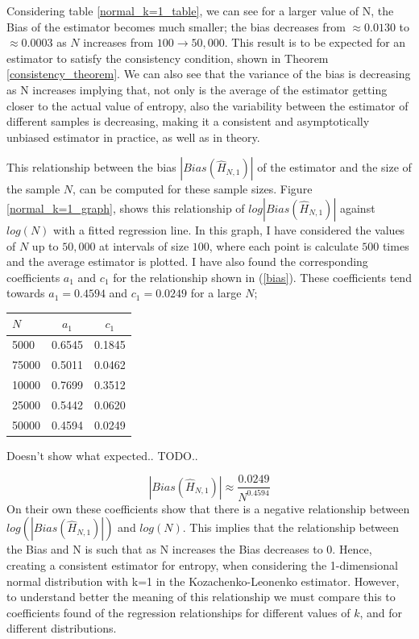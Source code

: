 \documentclass{article}
\begin{document}
Considering table \ref{normal_k=1_table}, we can see for a larger value of N, the Bias of the estimator becomes much smaller; the bias decreases from $\approx 0.0130$ to $\approx 0.0003$ as $N$ increases from $100 \to 50,000$. This result is to be expected for an estimator to satisfy the consistency condition, shown in Theorem \ref{consistency_theorem}. We can also see that the variance of the bias is decreasing as N increases implying that, not only is the average of the estimator getting closer to the actual value of entropy, also the variability between the estimator of different samples is decreasing, making it a consistent and asymptotically unbiased estimator in practice, as well as in theory.

This relationship between the bias $|Bias(\hat{H}_{N, 1})|$ of the estimator and the size of the sample $N$, can be computed for these sample sizes. Figure \ref{normal_k=1_graph}, shows this relationship of $log|Bias(\hat{H}_{N, 1})|$ against $log(N)$ with a fitted regression line. In this graph, I have considered the values of $N$ up to $50,000$ at intervals of size $100$, where each point is calculate $500$ times and the average estimator is plotted. I have also found the corresponding coefficients $a_{1}$ and $c_{1}$ for the relationship shown in (\ref{bias}). These coefficients tend towards $a_{1} = 0.4594$ and $c_{1} = 0.0249$ for a large $N$; 
\begin{table}
\begin{center}
\begin{tabular}{| l | c c|}
\toprule
$N$ & $a_{1}$ & $c_{1}$ \\
\midrule[1pt]
5000   &  0.6545   &   0.1845   \\
75000 &  0.5011   &   0.0462   \\
10000 &  0.7699   &   0.3512   \\
25000 &  0.5442   &   0.0620   \\
50000 &  0.4594   &   0.0249   \\
\end{tabular}
\end{center}
\end{table}

Doesn't show what expected.. TODO..

\begin{equation}
|Bias(\hat{H}_{N, 1})| \approx \frac{0.0249}{N^{0.4594}} \nonumber
\end{equation}
On their own these coefficients show that there is a negative relationship between $log(|Bias(\hat{H}_{N, 1})|)$ and $log(N)$. This implies that the relationship between the Bias and N is such that as N increases the Bias decreases to 0. Hence, creating a consistent estimator for entropy, when considering the 1-dimensional normal distribution with k=1 in the Kozachenko-Leonenko estimator. However, to understand better the meaning of this relationship we must compare this to coefficients found of the regression relationships for different values of $k$, and for different distributions.
\end{document}
